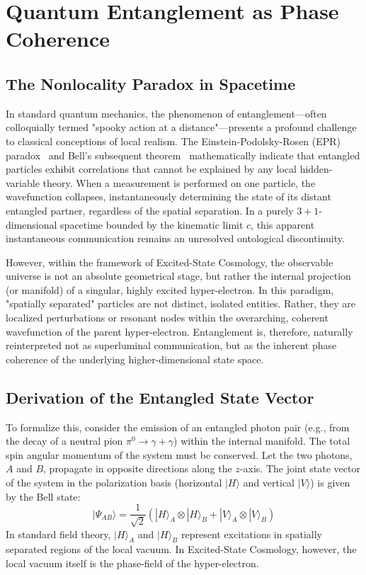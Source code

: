 \section{Quantum Entanglement as Phase Coherence}

\subsection{The Nonlocality Paradox in Spacetime}
In standard quantum mechanics, the phenomenon of entanglement—often colloquially termed "spooky action at a distance"—presents a profound challenge to classical conceptions of local realism. The Einstein-Podolsky-Rosen (EPR) paradox~\cite{Einstein1935EPR} and Bell's subsequent theorem~\cite{Bell1964, CHSH1969} mathematically indicate that entangled particles exhibit correlations that cannot be explained by any local hidden-variable theory. When a measurement is performed on one particle, the wavefunction collapses, instantaneously determining the state of its distant entangled partner, regardless of the spatial separation. In a purely $3+1$-dimensional spacetime bounded by the kinematic limit $c$, this apparent instantaneous communication remains an unresolved ontological discontinuity. \cite{Dicke1965, Lelli2016, Milgrom1983}

However, within the framework of Excited-State Cosmology, the observable universe is not an absolute geometrical stage, but rather the internal projection (or manifold) of a singular, highly excited hyper-electron. In this paradigm, "spatially separated" particles are not distinct, isolated entities. Rather, they are localized perturbations or resonant nodes within the overarching, coherent wavefunction of the parent hyper-electron. Entanglement is, therefore, naturally reinterpreted not as superluminal communication, but as the inherent phase coherence of the underlying higher-dimensional state space.

\subsection{Derivation of the Entangled State Vector}
To formalize this, consider the emission of an entangled photon pair (e.g., from the decay of a neutral pion $\pi^0 \to \gamma + \gamma$) within the internal manifold. The total spin angular momentum of the system must be conserved. Let the two photons, $A$ and $B$, propagate in opposite directions along the $z$-axis. The joint state vector of the system in the polarization basis (horizontal $|H\rangle$ and vertical $|V\rangle$) is given by the Bell state:
\begin{equation}
|\Psi_{AB}\rangle = \frac{1}{\sqrt{2}} \left( |H\rangle_A \otimes |H\rangle_B + |V\rangle_A \otimes |V\rangle_B \right)
\end{equation}
In standard field theory, $|H\rangle_A$ and $|H\rangle_B$ represent excitations in spatially separated regions of the local vacuum. In Excited-State Cosmology, however, the local vacuum itself is the phase-field of the hyper-electron. 


